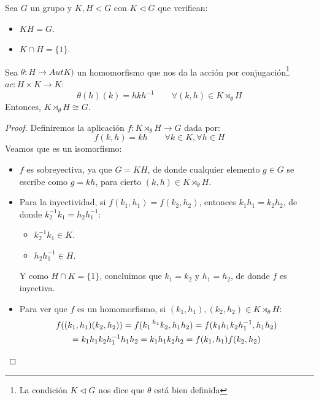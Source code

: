 \begin{teo}
    Sea $G$ un grupo y $K,H<G$ con $K\lhd G$ que verifican:
    \begin{itemize}
        \item $KH = G$.
        \item $K\cap H = \{1\}$.
    \end{itemize}
    Sea $\theta:H\to AutK)$ un homomorfismo que nos da la acción por conjugación\footnote{La condición $K\lhd G$ nos dice que $\theta$ está bien definida} $ac:H\times K\to K$:
    \begin{equation*}
        \theta(h)(k) = hkh^{-1} \qquad \forall (k,h)\in K\rtimes_\theta H
    \end{equation*}
    Entonces, $K\rtimes_\theta H \cong G$.
    \begin{proof}
        Definiremos la aplicación $f:K\rtimes_\theta H \to G$ dada por:
        \begin{equation*}
            f(k,h) = kh \qquad \forall k\in K, \forall h\in H
        \end{equation*}
        Veamos que es un isomorfismo:
        \begin{itemize}
            \item $f$ es sobreyectiva, ya que $G = KH$, de donde cualquier elemento $g\in G$ se escribe como $g = kh$, para cierto $(k,h)\in K\rtimes_\theta H$.
            \item Para la inyectividad, si $f(k_1,h_1) = f(k_2,h_2)$, entonces $k_1h_1 = k_2h_2$, de donde $k_2^{-1}k_1=h_2h_1^{-1}$:
                \begin{itemize}
                    \item $k_2^{-1}k_1\in K$.
                    \item $h_2h_1^{-1}\in H$.
                \end{itemize}
                Y como $H\cap K = \{1\}$, concluimos que $k_1 = k_2$ y $h_1 = h_2$, de donde $f$ es inyectiva.
            \item Para ver que $f$ es un homomorfismo, si $(k_1,h_1),(k_2,h_2)\in K\rtimes_\theta H$:
                \begin{multline*}
                    f((k_1,h_1)(k_2,h_2)) = f(k_1\prescript{h_1}{}{k_2},h_1h_2) = f(k_1h_1k_2h_1^{-1},h_1h_2) \\ = k_1h_1k_2h_1^{-1}h_1h_2 = k_1h_1k_2h_2 = f(k_1,h_1)f(k_2,h_2)
                \end{multline*}
        \end{itemize}
    \end{proof}
\end{teo}

